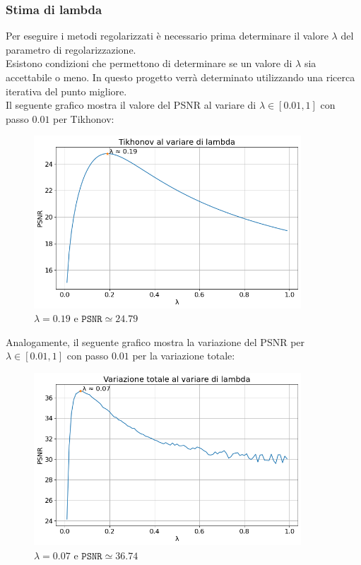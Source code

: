 \documentclass[11pt]{article}
\begin{document}
\subsubsection{Stima di lambda}
Per eseguire i metodi regolarizzati è necessario prima determinare il valore $\lambda$ del parametro di regolarizzazione.\\
Esistono condizioni che permettono di determinare se un valore di $\lambda$ sia accettabile o meno. In questo progetto verrà determinato utilizzando una ricerca iterativa del punto migliore.\\
Il seguente grafico mostra il valore del PSNR al variare di $\lambda \in [0.01, 1]$ con passo $0.01$ per Tikhonov:
\begin{figure}[H]
    \centering
    \includegraphics[width=10cm]{esecuzione/1/tikhonov_lambda.png}
    \caption{$\lambda=0.19$ e $\texttt{PSNR} \simeq 24.79$}
    \label{fig:tikhonov_lambda1}
\end{figure}
Analogamente, il seguente grafico mostra la variazione del PSNR per $\lambda \in [0.01, 1]$ con passo $0.01$ per la variazione totale:
\begin{figure}[H]
    \centering
    \includegraphics[width=10cm]{esecuzione/1/tv_lambda.png}
    \caption{$\lambda=0.07$ e $\texttt{PSNR} \simeq 36.74$}
    \label{fig:tv_lambda1}
\end{figure}
\end{document}
